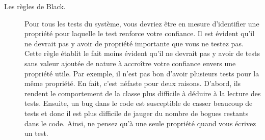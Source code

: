 \documentclass[a4paper,10pt,twoside]{book}
\begin{document}
{\begin{description}
\item[Les règles de Black.]
Pour tous les tests du système, vous devriez être en mesure d'identifier une propriété 
pour laquelle le test renforce votre confiance. Il est évident qu'il ne devrait pas y avoir de 
propriété importante que vous ne testez pas. Cette règle établit le fait moins évident qu'il ne 
devrait pas y avoir de tests sans valeur ajoutée de nature à accroître votre confiance envers 
une propriété utile.
Par exemple, il n'est pas bon d'avoir plusieurs tests pour la même propriété.
En fait, c'est néfaste pour deux raisons.
D'abord, ils  rendent le comportement de la classe plus difficile à déduire à la lecture des tests.
Ensuite, un bug dans le code est susceptible de casser beaucoup de
tests et donc il est plus difficile de jauger du nombre de bogues restants dans le code. 
Ainsi, ne pensez qu'à une seule propriété quand vous écrivez un test.
\end{description}




}
\end{document}
